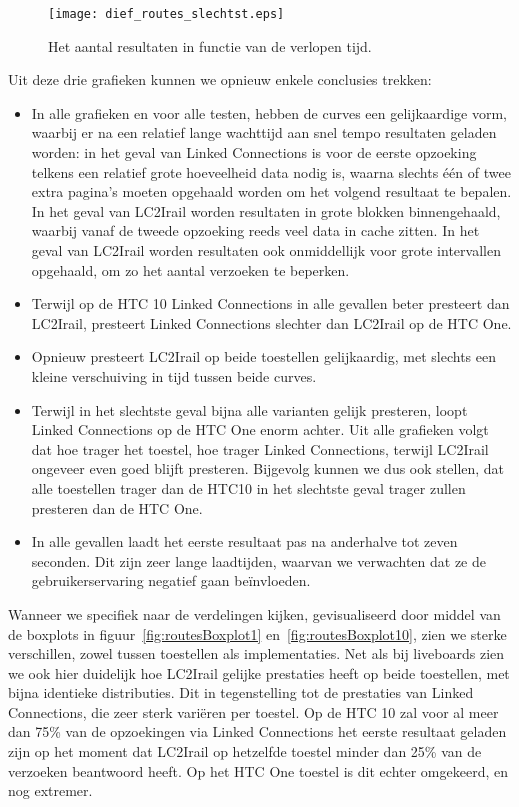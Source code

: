 \begin{figure}[h]
	\centering
	\texttt{[image: dief\_routes\_slechtst.eps]}
	\caption[Aantal resultaten routes in functie van de tijd (90e percentiel)]{Het aantal resultaten in functie van de verlopen tijd.}
	\label{fig:routesDiefSlechtst}
\end{figure}

Uit deze drie grafieken kunnen we opnieuw enkele conclusies trekken:
\begin{itemize}
	\item In alle grafieken en voor alle testen, hebben de curves een gelijkaardige vorm, waarbij er na een relatief lange wachttijd aan snel tempo resultaten geladen worden: in het geval van Linked Connections is voor de eerste opzoeking telkens een relatief grote hoeveelheid data nodig is, waarna slechts één of twee extra pagina's moeten opgehaald worden om het volgend resultaat te bepalen. In het geval van LC2Irail worden resultaten in grote blokken binnengehaald, waarbij vanaf de tweede opzoeking reeds veel data in cache zitten. In het geval van LC2Irail worden resultaten ook onmiddellijk voor grote intervallen opgehaald, om zo het aantal verzoeken te beperken. 
	\item Terwijl op de HTC 10 Linked Connections in alle gevallen beter presteert dan LC2Irail, presteert Linked Connections slechter dan LC2Irail op de HTC One. 
	\item Opnieuw presteert LC2Irail op beide toestellen gelijkaardig, met slechts een kleine verschuiving in tijd tussen beide curves.
	\item Terwijl in het slechtste geval bijna alle varianten gelijk presteren, loopt Linked Connections op de HTC One enorm achter. Uit alle grafieken volgt dat hoe trager het toestel, hoe trager Linked Connections, terwijl LC2Irail ongeveer even goed blijft presteren. Bijgevolg kunnen we dus ook stellen, dat alle toestellen trager dan de HTC10 in het slechtste geval trager zullen presteren dan de HTC One.
	\item In alle gevallen laadt het eerste resultaat pas na anderhalve tot zeven seconden. Dit zijn zeer lange laadtijden, waarvan we verwachten dat ze de gebruikerservaring negatief gaan beïnvloeden.
\end{itemize}

Wanneer we specifiek naar de verdelingen kijken, gevisualiseerd door middel van de boxplots in figuur~\ref{fig:routesBoxplot1} en~\ref{fig:routesBoxplot10}, zien we sterke verschillen, zowel tussen toestellen als implementaties. Net als bij liveboards zien we ook hier duidelijk hoe LC2Irail gelijke prestaties heeft op beide toestellen, met bijna identieke distributies. Dit in tegenstelling tot de prestaties van Linked Connections, die zeer sterk variëren per toestel. Op de HTC 10 zal voor al meer dan 75\% van de opzoekingen via Linked Connections het eerste resultaat geladen zijn op het moment dat LC2Irail op hetzelfde toestel minder dan 25\% van de verzoeken beantwoord heeft. Op het HTC One toestel is dit echter omgekeerd, en nog extremer. 

